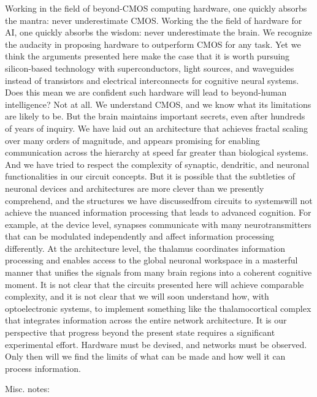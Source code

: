 \documentclass[twocolumn]{article}
\begin{document}
\vspace{3em}
Working in the field of beyond-CMOS computing hardware, one quickly absorbs the mantra: never underestimate CMOS. Working the the field of hardware for AI, one quickly absorbs the wisdom: never underestimate the brain. We recognize the audacity in proposing hardware to outperform CMOS for any task. Yet we think the arguments presented here make the case that it is worth pursuing silicon-based technology with superconductors, light sources, and waveguides instead of transistors and electrical interconnects for cognitive neural systems. Does this mean we are confident such hardware will lead to beyond-human intelligence? Not at all. We understand CMOS, and we know what its limitations are likely to be. But the brain maintains important secrets, even after hundreds of years of inquiry. We have laid out an architecture that achieves fractal scaling over many orders of magnitude, and appears promising for enabling communication across the hierarchy at speed far greater than biological systems. And we have tried to respect the complexity of synaptic, dendritic, and neuronal functionalities in our circuit concepts. But it is possible that the subtleties of neuronal devices and architectures are more clever than we presently comprehend, and the structures we have discussed\textemdash from circuits to systems\textemdash will not achieve the nuanced information processing that leads to advanced cognition. For example, at the device level, synapses communicate with many neurotransmitters that can be modulated independently and affect information processing differently. At the architecture level, the thalamus coordinates information processing and enables access to the global neuronal workspace in a masterful manner that unifies the signals from many brain regions into a coherent cognitive moment. It is not clear that the circuits presented here will achieve comparable complexity, and it is not clear that we will soon understand how, with optoelectronic systems, to implement something like the thalamocortical complex that integrates information across the entire network architecture. It is our perspective that progress beyond the present state requires a significant experimental effort. Hardware must be devised, and networks must be observed. Only then will we find the limits of what can be made and how well it can process information.

\vspace{4em}
Misc. notes:
\end{document}
